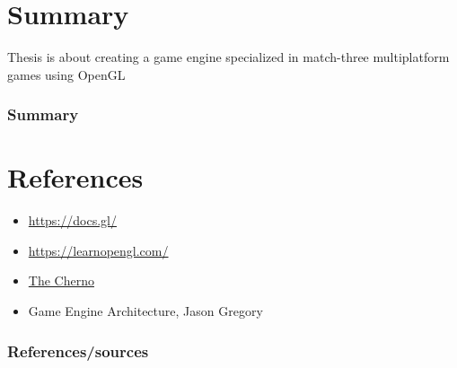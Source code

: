 \documentclass{beamer}
\begin{document}
    \section{Summary}
\begin{frame}
    Thesis is about creating a game engine specialized in match-three multiplatform games using OpenGL
    \frametitle{Summary}
    \end{frame}

\section{References}
\begin{frame}
    \begin{itemize}
        \item \href{https://docs.gl/}{https://docs.gl/}
    \item \href{https://learnopengl.com/}{https://learnopengl.com/}
    \item \href{https://www.youtube.com/c/gameengineseries}{The Cherno}
    \item Game Engine Architecture, Jason Gregory
    \end{itemize}
    \frametitle{References/sources}
    \end{frame}
\end{document}
